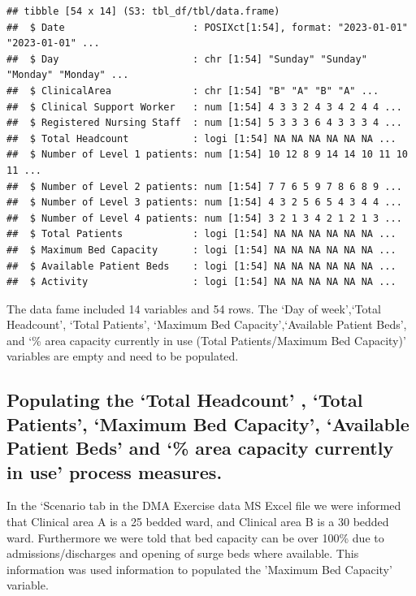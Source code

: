 \documentclass[
]{article}
\begin{document}
\begin{verbatim}
## tibble [54 x 14] (S3: tbl_df/tbl/data.frame)
##  $ Date                      : POSIXct[1:54], format: "2023-01-01" "2023-01-01" ...
##  $ Day                       : chr [1:54] "Sunday" "Sunday" "Monday" "Monday" ...
##  $ ClinicalArea              : chr [1:54] "B" "A" "B" "A" ...
##  $ Clinical Support Worker   : num [1:54] 4 3 3 2 4 3 4 2 4 4 ...
##  $ Registered Nursing Staff  : num [1:54] 5 3 3 3 6 4 3 3 3 4 ...
##  $ Total Headcount           : logi [1:54] NA NA NA NA NA NA ...
##  $ Number of Level 1 patients: num [1:54] 10 12 8 9 14 14 10 11 10 11 ...
##  $ Number of Level 2 patients: num [1:54] 7 7 6 5 9 7 8 6 8 9 ...
##  $ Number of Level 3 patients: num [1:54] 4 3 2 5 6 5 4 3 4 4 ...
##  $ Number of Level 4 patients: num [1:54] 3 2 1 3 4 2 1 2 1 3 ...
##  $ Total Patients            : logi [1:54] NA NA NA NA NA NA ...
##  $ Maximum Bed Capacity      : logi [1:54] NA NA NA NA NA NA ...
##  $ Available Patient Beds    : logi [1:54] NA NA NA NA NA NA ...
##  $ Activity                  : logi [1:54] NA NA NA NA NA NA ...
\end{verbatim}

The data fame included 14 variables and 54 rows. The `Day of
week',`Total Headcount', `Total Patients', `Maximum Bed
Capacity',`Available Patient Beds', and `\% area capacity currently in
use (Total Patients/Maximum Bed Capacity)' variables are empty and need
to be populated.

\hypertarget{populating-the-total-headcount-total-patients-maximum-bed-capacity-available-patient-beds-and-area-capacity-currently-in-use-process-measures.}{%
\subsection{Populating the `Total Headcount' , `Total Patients',
`Maximum Bed Capacity', `Available Patient Beds' and `\% area capacity
currently in use' process
measures.}\label{populating-the-total-headcount-total-patients-maximum-bed-capacity-available-patient-beds-and-area-capacity-currently-in-use-process-measures.}}

In the `Scenario tab in the DMA Exercise data MS Excel file we were
informed that Clinical area A is a 25 bedded ward, and Clinical area B
is a 30 bedded ward. Furthermore we were told that bed capacity can be
over 100\% due to admissions/discharges and opening of surge beds where
available. This information was used information to populated the
'Maximum Bed Capacity' variable.
\end{document}
